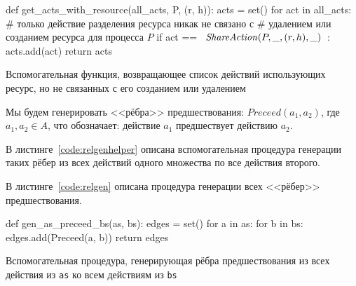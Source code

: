 \begin{listing}[ht!]
\begin{pythoncode}
def get_acts_with_resource(all_acts, P, (r, h)):
    acts = set()
    for act in all_acts:
        # только действие разделения ресурса никак не связано с
        # удалением или созданием ресурса для процесса $P$
        if act == ~$\crshare{P}{\_}{(r,h)}{\_}$~:
            acts.add(act)
    return acts
\end{pythoncode}
\caption{Вспомогательная функция, возвращающее список действий использующих ресурс, но не связанных с его созданием или удалением}
\label{code:relhelpLast}
\end{listing}

Мы будем генерировать <<рёбра>> предшествования: $Preceed(a_1, a_2)$, где $a_1, a_2 \in A$, что обозначает: действие $a_1$ предшествует действию $a_2$.

В листинге~\ref{code:relgenhelper} описана вспомогательная процедура генерации таких рёбер из всех действий одного множества по все действия второго.

В листинге~\ref{code:relgen} описана процедура генерации всех <<рёбер>> предшествования.

\begin{listing}[ht!]
\begin{pythoncode}
def gen_as_preceed_bs(as, bs):
    edges = set()
    for a in as:
        for b in bs:
            edges.add(Preceed(a, b))
    return edges
\end{pythoncode}
\caption{Вспомогательная процедура, генерирующая рёбра предшествования из всех действия из \texttt{as} ко всем действиям из \texttt{bs}}
\label{code:relgenhelper}
\end{listing}

